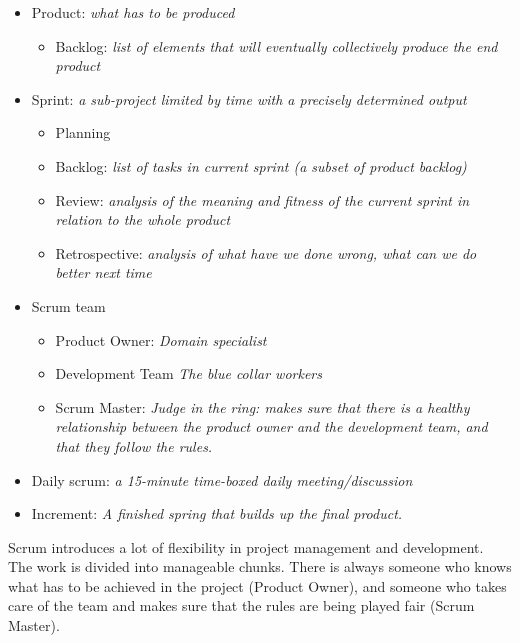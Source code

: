 \begin{itemize}

\item
  Product: \emph{what has to be produced}

  \begin{itemize}
  
  \item
    Backlog: \emph{list of elements that will eventually collectively
    produce the end product}
  \end{itemize}
\item
  Sprint: \emph{a sub-project limited by time with a precisely
  determined output}

  \begin{itemize}
  
  \item
    Planning
  \item
    Backlog: \emph{list of tasks in current sprint (a subset of product
    backlog)}
  \item
    Review: \emph{analysis of the meaning and fitness of the current
    sprint in relation to the whole product}
  \item
    Retrospective: \emph{analysis of what have we done wrong, what can
    we do better next time}
  \end{itemize}
\item
  Scrum team

  \begin{itemize}
  
  \item
    Product Owner: \emph{Domain specialist}
  \item
    Development Team \emph{The blue collar workers}
  \item
    Scrum Master: \emph{Judge in the ring: makes sure that there is a
    healthy relationship between the product owner and the development
    team, and that they follow the rules.}
  \end{itemize}
\item
  Daily scrum: \emph{a 15-minute time-boxed daily meeting/discussion}
\item
  Increment: \emph{A finished spring that builds up the final product.}
\end{itemize}

Scrum introduces a lot of flexibility in project management and
development. The work is divided into manageable chunks. There is always
someone who knows what has to be achieved in the project (Product
Owner), and someone who takes care of the team and makes sure that the
rules are being played fair (Scrum Master).

